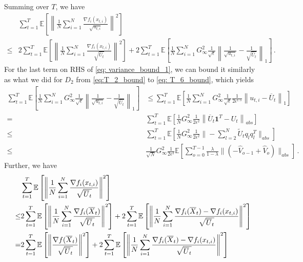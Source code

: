 \documentclass{article} %
\begin{document}
Summing over $T$, we have
\begin{align}\label{eq: variance_bound_1}
&\sum_{t=1}^T \mathbb E \left[  \left\| \frac{1}{N} \sum_{i=1}^N \frac{\nabla f_i(x_{t,i})}{\sqrt{u_{t,i}}} \right\|^2     \right]   \nonumber \\
\leq & 2\sum_{t=1}^T \mathbb E \left[  \left\|\frac{1}{N} \sum_{i=1}^N \frac{\nabla f_i(x_{t,i})}{\sqrt{\overline U_t}  } \right\|^2 \right] + 2 \sum_{t=1}^T \mathbb E \left[  \frac{1}{N} \sum_{i=1}^N G_{\infty}^2  \frac{1}{\sqrt{\epsilon}}\left\|     \frac{1}{\sqrt{u_{t,i}}} - \frac{1}{\sqrt{\overline U_{t}}}  \right\|_1     \right] \, .
\end{align}
For the last term on RHS of \eqref{eq: variance_bound_1}, we can bound it similarly as what we did for $D_2$ from \eqref{eq:T_2_bound} to \eqref{eq: T_6_bound}, which yields
\begin{align}\label{eq: diff_u}
\sum_{t=1}^T \mathbb E \left[  \frac{1}{N} \sum_{i=1}^N G_{\infty}^2  \frac{1}{\sqrt{\epsilon}}\left\|     \frac{1}{\sqrt{u_{t,i}}} - \frac{1}{\sqrt{\overline U_{t}}}  \right\|_1     \right]&  \leq  \sum_{t=1}^T \mathbb E \left[  \frac{1}{N} \sum_{i=1}^N G_{\infty}^2  \frac{1}{\sqrt{\epsilon}} \frac{1}{2\epsilon^{1.5}} \left\|  u_{t,i} -    \overline U_{t}  \right\|_1     \right] \nonumber \\
=& \sum_{t=1}^T \mathbb E \left[  \frac{1}{N}  G_{\infty}^2 \frac{1}{2\epsilon^2} \left\|     \overline U_{t} \mathbf 1^T - U_{t}  \right\|_{abs}    \right]  \nonumber \\
\leq & \sum_{t=1}^T \mathbb E \left[  \frac{1}{N}  G_{\infty}^2 \frac{1}{2\epsilon^2} \| - \sum_{l=2}^N   \tilde U_t q_l q_l^T \|_{abs}    \right] \nonumber \\ 
\leq & \frac{1}{\sqrt{N}}  G_{\infty}^2 \frac{1}{2\epsilon^2}   \mathbb E \left[   \sum_{o=0}^{T-1} \frac{\lambda}{1-\lambda}     \|    (- \hat V_{o-1} + \hat V_{o} ) \|_{abs}    \right] \, .
\end{align}
Further, we have 
\begin{align}\notag
\begin{split}
&\sum_{t=1}^T \mathbb E \left[  \left\|\frac{1}{N} \sum_{i=1}^N \frac{\nabla f_i(x_{t,i})}{\sqrt{\overline U_t}  } \right\|^2 \right]   \\
\leq & 2 \sum_{t=1}^T \mathbb E \left[  \left\|\frac{1}{N} \sum_{i=1}^N \frac{\nabla f_i(\overline X_{t})}{\sqrt{\overline U_t}  } \right\|^2 \right] + 2 \sum_{t=1}^T \mathbb E \left[  \left\|\frac{1}{N} \sum_{i=1}^N \frac{\nabla f_i(\overline X_t) - \nabla f_i(x_{t,i})}{\sqrt{\overline U_t}  } \right\|^2 \right]  \\
= & 2 \sum_{t=1}^T \mathbb E \left[  \left\| \frac{\nabla f(\overline X_{t})}{\sqrt{\overline U_t}  } \right\|^2 \right] + 2 \sum_{t=1}^T \mathbb E \left[  \left\|\frac{1}{N} \sum_{i=1}^N \frac{\nabla f_i(\overline X_t) - \nabla f_i(x_{t,i})}{\sqrt{\overline U_t}  } \right\|^2 \right] 
\end{split}
\end{align}
\end{document}
